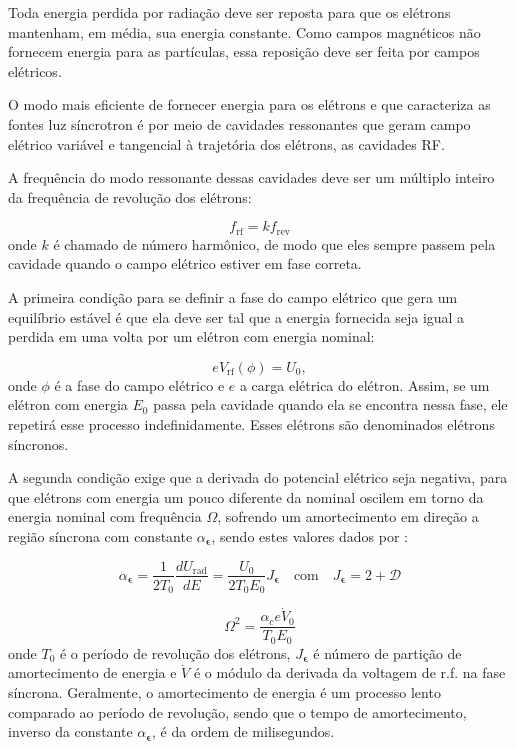 Toda energia perdida por radiação deve ser reposta para que os elétrons mantenham, em média, sua energia constante. Como campos magnéticos não fornecem energia para as partículas, essa reposição deve ser feita por campos elétricos.

O modo mais eficiente de fornecer energia para os elétrons e que caracteriza as fontes luz síncrotron é por meio de cavidades ressonantes que geram campo elétrico variável e tangencial à trajetória dos elétrons, as cavidades RF.

A frequência do modo ressonante dessas cavidades deve ser um múltiplo inteiro da frequência de revolução dos elétrons:

\begin{equation}
 f_\mathrm{rf}=kf_\mathrm{rev}
\end{equation}
onde $k$ é chamado de número harmônico, de modo que eles sempre passem pela cavidade quando o campo elétrico estiver em fase correta.

A primeira condição para se definir a fase do campo elétrico que gera um equilíbrio estável é que ela deve ser tal que a energia fornecida seja igual a perdida em uma volta por um elétron com energia nominal:

\begin{equation}
 e V_\mathrm{rf}(\phi)=U_0 ,
\end{equation}
onde $\phi$ é a fase do campo elétrico e $e$ a carga elétrica do elétron. Assim, se um elétron com energia $E_0$ passa pela cavidade quando ela se encontra nessa fase, ele repetirá esse processo indefinidamente. Esses elétrons são denominados elétrons síncronos.

A segunda condição exige que a derivada do potencial elétrico seja negativa, para que elétrons com energia um pouco diferente da nominal oscilem em torno da energia nominal com frequência $\Omega$, sofrendo um amortecimento em direção a região síncrona com constante $\alpha_{\boldsymbol{\epsilon}}$, sendo estes valores dados por \cite{Sands}:

\begin{equation}
 \alpha_{\boldsymbol{\epsilon}}=\frac{1}{2T_0}\frac{d U_\mathrm{rad}}{d E} =
 \frac{U_0}{2 T_0 E_0}J_{\boldsymbol{\epsilon}} \quad \text{com} \quad
 J_{\boldsymbol{\epsilon}} = 2+\mathcal{D}
\end{equation}

\begin{equation}
 \Omega^2 = \frac{\alpha_c e \dot{V}_0}{T_0 E_0}
\end{equation}
onde $T_0$ é o período de revolução dos elétrons, $J_{\boldsymbol{\epsilon}}$ é número de partição de amortecimento de energia e $\dot{V}$ é o módulo da derivada da voltagem de r.f. na fase síncrona. Geralmente, o amortecimento de energia é um processo lento comparado ao período de revolução, sendo que o tempo de amortecimento, inverso da constante $\alpha_{\boldsymbol{\epsilon}}$, é da ordem de milisegundos.

